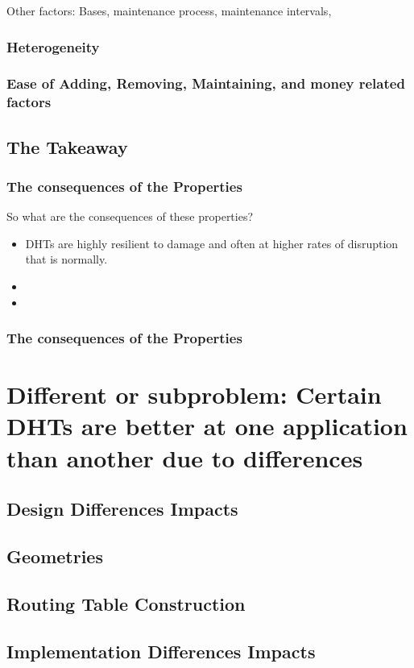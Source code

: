 \documentclass[10pt,letterpaper]{report}
\begin{document}
Other factors: Bases, maintenance process, maintenance intervals,

\subsubsection{Heterogeneity}
\subsubsection{Ease of Adding, Removing, Maintaining, and money related factors}

\subsection{The Takeaway}


\subsubsection{The consequences of the Properties}
So what are the consequences of these properties?
\begin{itemize}
	\item DHTs are highly resilient to damage and often at higher rates of disruption that is normally.
	\item 
	\item 
\end{itemize}


\subsubsection{The consequences of the Properties}


\section{Different or subproblem: Certain DHTs are better at one application than another due to differences}
\subsection{Design Differences Impacts}
\subsection{Geometries}
\subsection{Routing Table Construction}
\subsection{Implementation Differences Impacts}
\end{document}
